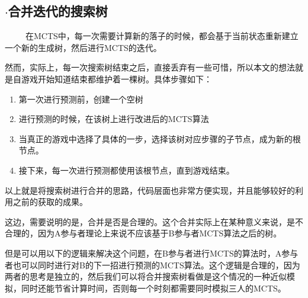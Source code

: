 \documentclass[9pt,twocolumn,twoside]{osajnl}
\begin{document}
\subsection{$\cdot$合并迭代的搜索树}
\begin{adjustwidth}{2em}{}	
	\ \ \ \ \
	在MCTS中，每一次需要计算新的落子的时候，都会基于当前状态重新建立一个新的生成树，然后进行MCTS的迭代。
	
	然而，实际上，每一次搜索树结束之后，直接丢弃有一些可惜，所以本文的想法就是自游戏开始知道结束都维护着一棵树。具体步骤如下：
	
	\begin{enumerate}
		\item 第一次进行预测前，创建一个空树
		\item 进行预测的时候，在该树上进行改进后的MCTS算法
		\item 当真正的游戏中选择了具体的一步，选择该树对应步骤的子节点，成为新的根节点。
		\item 接下来，每一次进行预测都使用该根节点，直到游戏结束。
	\end{enumerate}
	
	以上就是将搜索树进行合并的思路，代码层面也非常方便实现，并且能够较好的利用之前的获取的成果。
	
	这边，需要说明的是，合并是否是合理的。这个合并实际上在某种意义来说，是不合理的，因为A参与者理论上来说不应该基于B参与者MCTS算法之后的树。
	
	但是可以用以下的逻辑来解决这个问题，在B参与者进行MCTS的算法时，A参与者也可以同时进行对B的下一招进行预测的MCTS算法。这个逻辑是合理的，因为两者的思考是独立的，然后我们可以将合并搜索树看做是这个情况的一种近似模拟，同时还能节省计算时间，否则每一个时刻都需要同时模拟三人的MCTS。
	
\end{adjustwidth}
\end{document}
